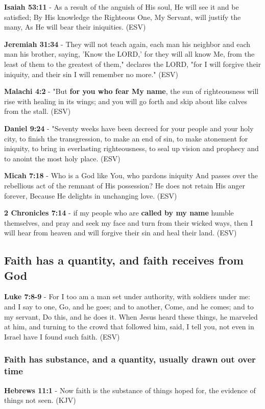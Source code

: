\documentclass[11pt]{article}
\begin{document}
\textbf{Isaiah 53:11} - As a result of the anguish of His soul, He will see it and be satisfied; By His knowledge the Righteous One, My Servant, will justify the many, As He will bear their iniquities. (ESV)

\textbf{Jeremiah 31:34} - They will not teach again, each man his neighbor and each man his brother, saying, 'Know the LORD,' for they will all know Me, from the least of them to the greatest of them," declares the LORD, "for I will forgive their iniquity, and their sin I will remember no more." (ESV)

\textbf{Malachi 4:2} - "But \textbf{for you who fear My name}, the sun of righteousness will rise with healing in its wings; and you will go forth and skip about like calves from the stall. (ESV)

\textbf{Daniel 9:24} - "Seventy weeks have been decreed for your people and your holy city, to finish the transgression, to make an end of sin, to make atonement for iniquity, to bring in everlasting righteousness, to seal up vision and prophecy and to anoint the most holy place.  (ESV)

\textbf{Micah 7:18} - Who is a God like You, who pardons iniquity And passes over the rebellious act of the remnant of His possession? He does not retain His anger forever, Because He delights in unchanging love. (ESV)

\textbf{2 Chronicles 7:14} -  if my people who are \textbf{called by my name} humble themselves, and pray and seek my face and turn from their wicked ways, then I will hear from heaven and will forgive their sin and heal their land.  (ESV)

\subsection{Faith has a quantity, and faith receives from God}
\label{sec:orge3c564f}
\textbf{Luke 7:8-9} -  For I too am a man set under authority, with soldiers under me: and I say to one, Go, and he goes; and to another, Come, and he comes; and to my servant, Do this, and he does it.  When Jesus heard these things, he marveled at him, and turning to the crowd that followed him, said, I tell you, not even in Israel have I found such faith.  (ESV)

\subsubsection{Faith has substance, and a quantity, usually drawn out over time}
\label{sec:orgbae528b}
\textbf{Hebrews 11:1} -  Now faith is the substance of things hoped for, the evidence of things not seen.  (KJV)
\end{document}
